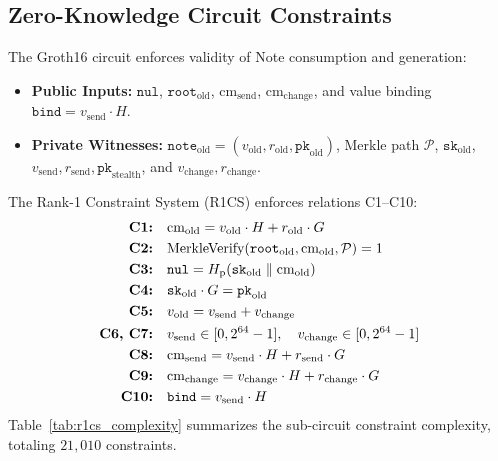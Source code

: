 \documentclass[sigconf,nonacm]{acmart}
\begin{document}
\subsection{Zero-Knowledge Circuit Constraints}
The Groth16 circuit enforces validity of Note consumption and generation:
\begin{itemize}
    \item \textbf{Public Inputs:} $\mathtt{nul}$, $\mathtt{root}_{\text{old}}$, $\text{cm}_{\text{send}}$, $\text{cm}_{\text{change}}$, and value binding $\mathtt{bind} = v_{\text{send}} \cdot H$.
    \item \textbf{Private Witnesses:} $\mathtt{note}_{\text{old}} = (v_{\text{old}}, r_{\text{old}}, \mathtt{pk}_{\text{old}})$, Merkle path $\mathcal{P}$, $\mathtt{sk}_{\text{old}}$, $v_{\text{send}}, r_{\text{send}}, \mathtt{pk}_{\text{stealth}}$, and $v_{\text{change}}, r_{\text{change}}$.
\end{itemize}
The Rank-1 Constraint System (R1CS) enforces relations C1--C10:
\begin{align}
\text{\textbf{C1:}} \quad & \text{cm}_{\text{old}} = v_{\text{old}} \cdot H + r_{\text{old}} \cdot G \\
\text{\textbf{C2:}} \quad & \text{MerkleVerify}(\mathtt{root}_{\text{old}}, \text{cm}_{\text{old}}, \mathcal{P}) = 1 \\
\text{\textbf{C3:}} \quad & \mathtt{nul} = H_{\text{p}}(\mathtt{sk}_{\text{old}} \parallel \text{cm}_{\text{old}}) \\
\text{\textbf{C4:}} \quad & \mathtt{sk}_{\text{old}} \cdot G = \mathtt{pk}_{\text{old}} \\
\text{\textbf{C5:}} \quad & v_{\text{old}} = v_{\text{send}} + v_{\text{change}} \\
\text{\textbf{C6, C7:}} \quad & v_{\text{send}} \in [0, 2^{64}-1], \quad v_{\text{change}} \in [0, 2^{64}-1] \\
\text{\textbf{C8:}} \quad & \text{cm}_{\text{send}} = v_{\text{send}} \cdot H + r_{\text{send}} \cdot G \\
\text{\textbf{C9:}} \quad & \text{cm}_{\text{change}} = v_{\text{change}} \cdot H + r_{\text{change}} \cdot G \\
\text{\textbf{C10:}} \quad & \mathtt{bind} = v_{\text{send}} \cdot H
\end{align}
Table~\ref{tab:r1cs_complexity} summarizes the sub-circuit constraint complexity, totaling $21{,}010$ constraints.
\end{document}
